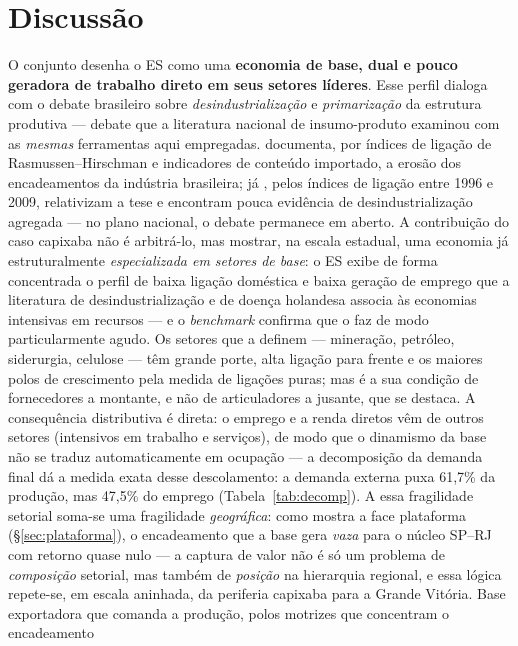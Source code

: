 \documentclass[11pt,a4paper]{article}
\begin{document}
\section{Discussão}
\label{sec:discussao}
O conjunto desenha o ES como uma \textbf{economia de base, dual e pouco geradora de
trabalho direto em seus setores líderes}. Esse perfil dialoga com o debate
brasileiro sobre \emph{desindustrialização} e \emph{primarização} da estrutura produtiva ---
debate que a literatura nacional de insumo-produto examinou com as \emph{mesmas} ferramentas
aqui empregadas. \citet{morceiro2012} documenta, por índices de ligação de
Rasmussen--Hirschman e indicadores de conteúdo importado, a erosão dos encadeamentos da
indústria brasileira; já \citet{nassif2015}, pelos índices de ligação entre 1996 e 2009,
relativizam a tese e encontram pouca evidência de desindustrialização agregada --- no plano
nacional, o debate permanece em aberto. A contribuição do caso capixaba não é arbitrá-lo, mas
mostrar, na escala estadual, uma economia já estruturalmente \emph{especializada em setores de
base}: o ES exibe de forma concentrada o perfil de baixa ligação doméstica e baixa geração de
emprego que a literatura de desindustrialização \citep{oreiro2010} e de doença holandesa
\citep{cordenneary1982} associa às economias intensivas em recursos --- e o \emph{benchmark}
confirma que o faz de modo particularmente agudo. Os setores que a definem --- mineração,
petróleo, siderurgia, celulose --- têm grande porte, alta ligação para frente e os
maiores polos de crescimento pela medida de ligações puras; mas é a sua condição de
fornecedores a montante, e não de articuladores a jusante, que se destaca. A
consequência distributiva é direta: o emprego e a renda diretos vêm de outros setores
(intensivos em trabalho e serviços), de modo que o dinamismo da base não se traduz
automaticamente em ocupação --- a decomposição da demanda final dá a medida exata desse
descolamento: a demanda externa puxa 61,7\% da produção, mas 47,5\% do emprego
(Tabela~\ref{tab:decomp}). A essa fragilidade setorial soma-se uma fragilidade
\emph{geográfica}: como mostra a face plataforma (\S\ref{sec:plataforma}), o encadeamento que
a base gera \emph{vaza} para o núcleo SP--RJ com retorno quase nulo --- a captura de valor não
é só um problema de \emph{composição} setorial, mas também de \emph{posição} na hierarquia
regional, e essa lógica repete-se, em escala aninhada, da periferia capixaba para a Grande
Vitória. Base exportadora que comanda a produção, polos motrizes que concentram o encadeamento
\end{document}
